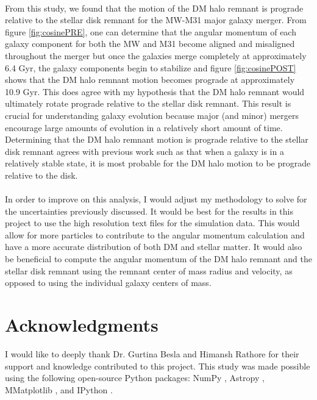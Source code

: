 \documentclass[fleqn,usenatbib]{mnras}
\begin{document}
\paragraph{} From this study, we found that the motion of the DM halo remnant is prograde relative to the stellar disk remnant for the MW-M31 major galaxy merger. From figure \ref{fig:cosinePRE}, one can determine that the angular momentum of each galaxy component for both the MW and M31 become aligned and misaligned throughout the merger but once the galaxies merge completely at approximately 6.4 Gyr, the galaxy components begin to stabilize and figure \ref{fig:cosinePOST} shows that the DM halo remnant motion becomes prograde at approximately 10.9 Gyr. This does agree with my hypothesis that the DM halo remnant would ultimately rotate prograde relative to the stellar disk remnant. This result is crucial for understanding galaxy evolution because major (and minor) mergers encourage large amounts of evolution in a relatively short amount of time. Determining that the DM halo remnant motion is prograde relative to the stellar disk remnant agrees with previous work such as \cite{Bett+2010} that when a galaxy is in a relatively stable state, it is most probable for the DM halo motion to be prograde relative to the disk.

\paragraph{} In order to improve on this analysis, I would adjust my methodology to solve for the uncertainties previously discussed. It would be best for the results in this project to use the high resolution text files for the simulation data. This would allow for more particles to contribute to the angular momentum calculation and have a more accurate distribution of both DM and stellar matter. It would also be beneficial to compute the angular momentum of the DM halo remnant and the stellar disk remnant using the remnant center of mass radius and velocity, as opposed to using the individual galaxy centers of mass.

\section{Acknowledgments} I would like to deeply thank Dr. Gurtina Besla and Himansh Rathore for their support and knowledge contributed to this project. This study was made possible using the following open-source Python packages: NumPy \citep{numpy}, Astropy \citep{Astropy}, MMatplotlib \citep{matplotlib}, and IPython \citep{iPython}.
\end{document}
